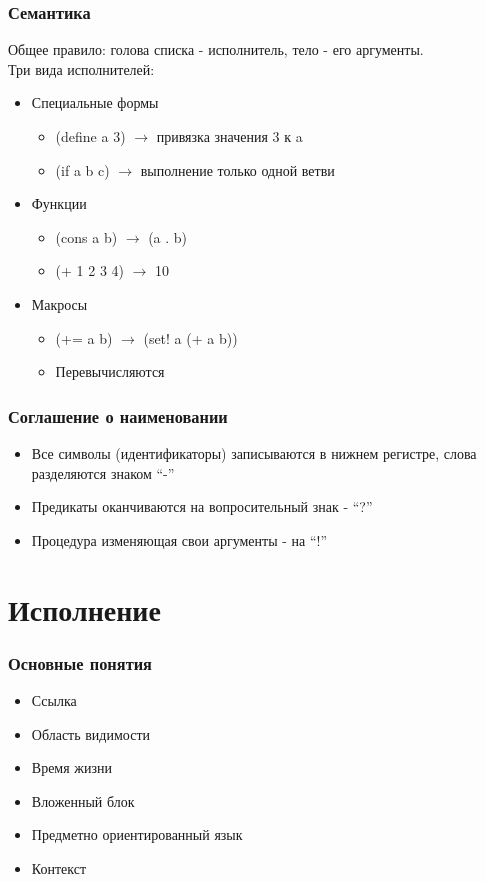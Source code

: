 \documentclass[16pt,pdf,unicode]{beamer}
\begin{document}
\begin{frame}
  \frametitle{Семантика}
  Общее правило: голова списка - исполнитель, тело - его аргументы.\\
  Три вида исполнителей:
  \begin{itemize}
   \item Специальные формы
     \begin{itemize}
       \item (define a 3) $\rightarrow$ привязка значения 3 к a
       \item (if a b c) $\rightarrow$ выполнение только одной ветви
     \end{itemize}
   \item Функции
     \begin{itemize}
     \item (cons a b) $\rightarrow$ (a . b)
     \item (+ 1 2 3 4) $\rightarrow$ 10
     \end{itemize}
   \item Макросы
     \begin{itemize}
     \item (+= a b) $\rightarrow$ (set! a (+ a b))
     \item Перевычисляются
     \end{itemize}
  \end{itemize}
\end{frame}

\begin{frame}
\frametitle{Соглашение о наименовании}
\begin{itemize}
  \item Все символы (идентификаторы) записываются в нижнем регистре, слова разделяются знаком ``-''
  \item Предикаты оканчиваются на вопросительный знак - ``?''
  \item Процедура изменяющая свои аргументы - на ``!''
\end{itemize}
\end{frame}

\section{Исполнение}
\begin{frame}
\frametitle{Основные понятия}
\begin{itemize}
\item Ссылка
\item Область видимости
\item Время жизни
\item Вложенный блок
\item Предметно ориентированный язык
\item Контекст
\end{itemize}
\end{frame}
\end{document}
